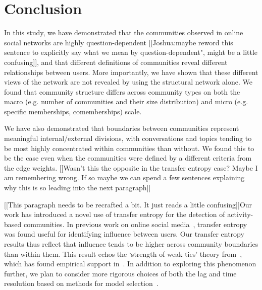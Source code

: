 \section{Conclusion}


In this study, we have demonstrated that the communities observed in online social networks are highly question-dependent [[Joshua:maybe reword this sentence to explicitly say what we mean by question-dependent", might be a little confusing]], and that different definitions of communities reveal different relationships between users. More importantly, we have shown that these different views of the network are not revealed by using the structural network alone. We found that community structure differs across community types on both the macro (e.g. number of communities and their size distribution) and micro (e.g. specific memberships, comemberships) scale.

We have also demonstrated that boundaries between communities represent meaningful internal/external divisions, with conversations and topics tending to be most highly concentrated within communities than without. We found this to be the case even when the communities were defined by a different criteria from the edge weights. [[Wasn't this the opposite in the transfer entropy case? Maybe I am remembering wrong. If so maybe we can spend a few sentences explaining why this is so leading into the next paragraph]]







[[This paragraph needs to be recrafted a bit. It just reads a little confusing]]Our work has introduced a novel use of transfer entropy for the detection of activity-based communities. In previous work on online social media~\cite{ver2012information}, transfer entropy was found useful for identifying influence between users. Our transfer entropy results thus reflect that influence tends to be higher across community boundaries than within them. This result echos the `strength of weak ties' theory from~\cite{granovetter1973strength}, which has found empirical support in~\cite{grabowicz2012social}. In addition to exploring this phenomenon further, we plan to consider more rigorous choices of both the lag and time resolution based on methods for model selection~\cite{claeskens2008model}.

